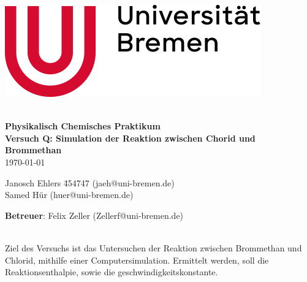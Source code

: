 \documentclass[a4paper, 11pt]{article}
\begin{document}
\begin{titlepage}
\begin{flushright}
\includegraphics[width=0.3\linewidth]{uni.png}
\end{flushright}

~\\[1cm]
{\bf \Huge
Physikalisch Chemisches Praktikum\\\large Versuch Q: Simulation der Reaktion zwischen Chorid und Brommethan
}\\[5mm]
\today

\vfill
\begin{tabbing}
Janosch Ehlers \hspace{3mm}\= 454747 (jaeh@uni-bremen.de)\\
Samed Hür  (huer@uni-bremen.de)\\
\end{tabbing}
\textbf{Betreuer}: Felix Zeller (Zellerf@uni-bremen.de)\\
~\\[3cm]

\clearpage
\thispagestyle{empty}
\end{titlepage}

\newpage
\tableofcontents
\thispagestyle{empty}
\clearpage
\newpage
{}


Ziel des Versuchs ist das Untersuchen der Reaktion zwischen Brommethan und Chlorid, mithilfe einer Computersimulation. Ermittelt werden, soll die Reaktionsenthalpie, sowie die geschwindigkeitskonstante.



\printbibliography
\end{document}
